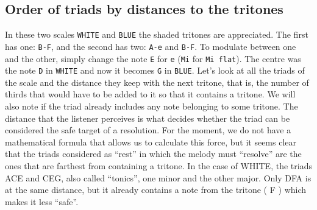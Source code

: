 \documentclass[]{report}
\begin{document}
\subsection{Order of triads by distances to the tritones}
In these two scales \texttt{WHITE} and \texttt{BLUE} the shaded tritones are appreciated. The first has one: \texttt{B-F}, and the second has two: \texttt{A-e} and \texttt{B-F}. To modulate between one and the other, simply change the note \texttt{E} for \texttt{e} (\texttt{Mi} for \texttt{Mi flat}). The centre was the note \texttt{D} in \texttt{WHITE} and now it becomes \texttt{G} in \texttt{BLUE}.
Let's look at all the triads of the scale and the distance they keep with the next tritone, that is, the number of thirds that would have to be added to it so that it contains a tritone. We will also note if the triad already includes any note belonging to some tritone. The distance that the listener perceives is what decides whether the triad can be considered the safe target of a resolution.
For the moment, we do not have a mathematical formula that allows us to calculate this force, but it seems clear that the triads considered as ``rest'' in which the melody must ``resolve'' are the ones that are farthest from containing a tritone. In the case of \textsf{WHITE}, the triads \textsf{ACE} and \textsf{CEG}, also called ``tonics'', one minor and the other major. Only \textsf{DFA} is at the same distance, but it already contains a note from the tritone ( \textsf{F} ) which makes it less ``safe''.
\end{document}
